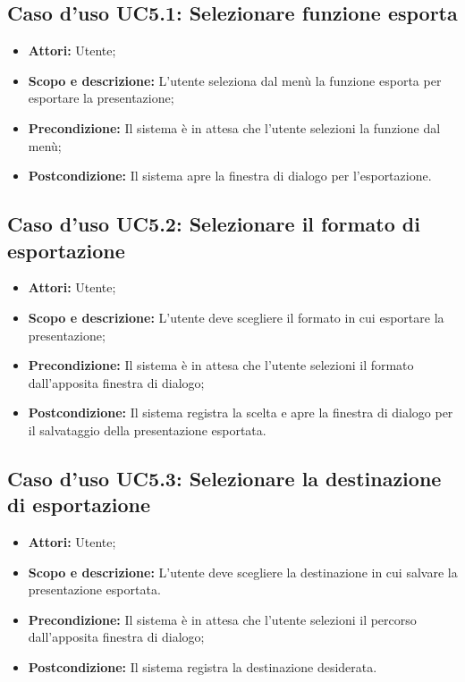 \subsection{Caso d'uso UC5.1: Selezionare funzione esporta}
	\begin{itemize}
		\item \textbf{Attori:} Utente;
		\item \textbf{Scopo e descrizione:} L'utente seleziona dal menù la funzione esporta per esportare la presentazione;
		\item \textbf{Precondizione:} Il sistema è in attesa che l'utente selezioni la funzione dal menù;
		\item \textbf{Postcondizione:} Il sistema apre la finestra di dialogo per l'esportazione.
	\end{itemize}


\subsection{Caso d'uso UC5.2: Selezionare il formato di esportazione}
	\begin{itemize}
		\item \textbf{Attori:} Utente;
		\item \textbf{Scopo e descrizione:} L'utente deve scegliere il formato in cui esportare la presentazione;
		\item \textbf{Precondizione:} Il sistema è in attesa che l'utente selezioni il formato dall'apposita finestra di dialogo;
		\item \textbf{Postcondizione:} Il sistema registra la scelta e apre la finestra di dialogo per il salvataggio della presentazione esportata.
	\end{itemize}


\subsection{Caso d'uso UC5.3: Selezionare la destinazione di esportazione}
	\begin{itemize}
		\item \textbf{Attori:} Utente;
		\item \textbf{Scopo e descrizione:} L'utente deve scegliere la destinazione in cui salvare la presentazione esportata.
		\item \textbf{Precondizione:} Il sistema è in attesa che l'utente selezioni il percorso dall'apposita finestra di dialogo;
		\item \textbf{Postcondizione:} Il sistema registra la destinazione desiderata.
	\end{itemize}


